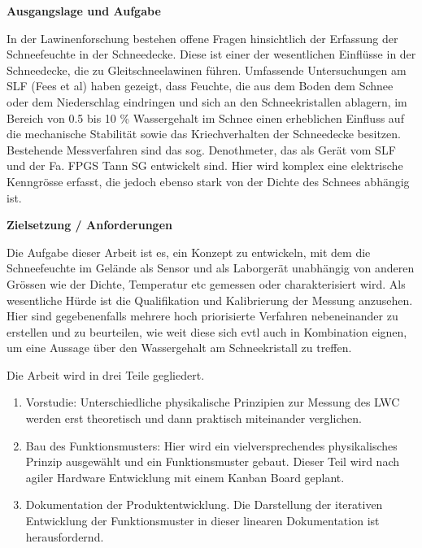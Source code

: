 


\textbf{Ausgangslage und Aufgabe}

In der Lawinenforschung bestehen offene Fragen hinsichtlich der Erfassung der Schneefeuchte in der Schneedecke. Diese ist einer der wesentlichen Einflüsse in der Schneedecke, die zu Gleitschneelawinen führen. Umfassende Untersuchungen am SLF (Fees et al) haben gezeigt, dass Feuchte, die aus dem Boden dem Schnee oder dem Niederschlag eindringen und sich an den Schneekristallen ablagern, im Bereich von 0.5 bis 10 \% Wassergehalt im Schnee einen erheblichen Einfluss auf die mechanische Stabilität sowie das Kriechverhalten der Schneedecke besitzen.
Bestehende Messverfahren sind das sog. Denothmeter, das als Gerät vom SLF und der Fa. FPGS Tann SG entwickelt sind. Hier wird komplex eine elektrische Kenngrösse erfasst, die jedoch ebenso stark von der Dichte des Schnees abhängig ist.

\textbf{Zielsetzung / Anforderungen}

Die Aufgabe dieser Arbeit ist es, ein Konzept zu entwickeln, mit dem die Schneefeuchte im Gelände als Sensor und als Laborgerät unabhängig von anderen Grössen wie der Dichte, Temperatur etc gemessen oder charakterisiert wird. Als wesentliche Hürde ist die Qualifikation und Kalibrierung der Messung anzusehen. Hier sind gegebenenfalls mehrere hoch priorisierte Verfahren nebeneinander zu erstellen und zu beurteilen, wie weit diese sich evtl auch in Kombination eignen, um eine Aussage über den Wassergehalt am Schneekristall zu treffen.


Die Arbeit wird in drei Teile gegliedert.

\begin{enumerate}
\item Vorstudie: Unterschiedliche physikalische Prinzipien zur Messung des LWC werden erst theoretisch und dann praktisch miteinander verglichen.

\item Bau des Funktionsmusters:  Hier wird ein vielversprechendes physikalisches Prinzip ausgewählt und ein Funktionsmuster gebaut. Dieser Teil wird nach agiler Hardware Entwicklung mit einem Kanban Board geplant. 

\item Dokumentation der Produktentwicklung. Die Darstellung der iterativen Entwicklung der Funktionsmuster in dieser linearen Dokumentation ist herausfordernd.
\end{enumerate}

